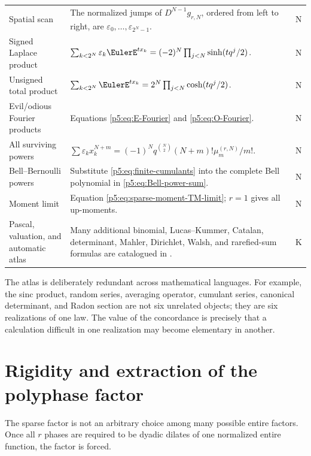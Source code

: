 \documentclass[11pt]{article}
\theoremstyle{definition}
\theoremstyle{remark}
\newcommand{\eps}{\varepsilon}
\newcommand{\statusknown}{\textsf{K}}
\newcommand{\statusnew}{\textsf{N}}
\begin{document}
\begin{longtable}{@{}p{}p{}p{}@{}}
Spatial scan &
The normalized jumps of $D^{N-1}g_{r,N}$, ordered from left to right, are
$\eps_0,\ldots,\eps_{2^N-1}$. & \statusnew\\
Signed Laplace product &
$\sum_{k<2^N}\eps_k\EulerE^{tx_k}=(-2)^N\prod_{j<N}\sinh(tq^j/2)$. & \statusnew\\
Unsigned total product &
$\sum_{k<2^N}\EulerE^{tx_k}=2^N\prod_{j<N}\cosh(tq^j/2)$. & \statusnew\\
Evil/odious Fourier products &
Equations \eqref{p5:eq:E-Fourier} and \eqref{p5:eq:O-Fourier}. & \statusnew\\
All surviving powers &
$\sum\eps_kx_k^{N+m}=(-1)^Nq^{\binom N2}(N+m)!\mu_m^{(r,N)}/m!$. & \statusnew\\
Bell--Bernoulli powers &
Substitute \eqref{p5:eq:finite-cumulants} into the complete Bell polynomial in
\eqref{p5:eq:Bell-power-sum}. & \statusnew\\
Moment limit &
Equation \eqref{p5:eq:sparse-moment-TM-limit}; $r=1$ gives all up-moments. & \statusnew\\
Pascal, valuation, and automatic atlas &
Many additional binomial, Lucas--Kummer, Catalan, determinant, Mahler,
Dirichlet, Walsh, and rarefied-sum formulas are catalogued in \cite{p5:repoAtlas}. & \statusknown\\
\bottomrule
\end{longtable}

\begin{statusboxPartx}
The atlas is deliberately redundant across mathematical languages.  For
example, the sinc product, random series, averaging operator, cumulant series,
canonical determinant, and Radon section are not six unrelated objects; they
are six realizations of one law.  The value of the concordance is precisely
that a calculation difficult in one realization may become elementary in
another.
\end{statusboxPartx}

\section{Rigidity and extraction of the polyphase factor}
\label{p5:sec:rigidity}

The sparse factor is not an arbitrary choice among many possible entire
factors.  Once all $r$ phases are required to be dyadic dilates of one
normalized entire function, the factor is forced.
\end{document}

